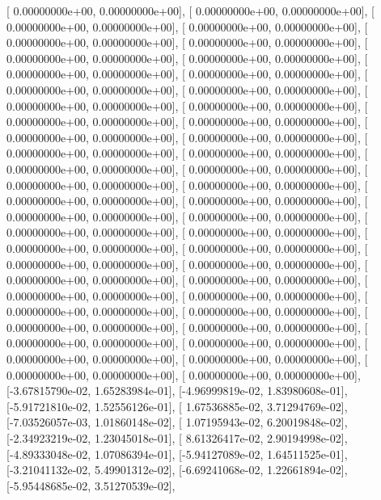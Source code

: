 \documentclass{article}
\begin{document}
       [ 0.00000000e+00,  0.00000000e+00],
       [ 0.00000000e+00,  0.00000000e+00],
       [ 0.00000000e+00,  0.00000000e+00],
       [ 0.00000000e+00,  0.00000000e+00],
       [ 0.00000000e+00,  0.00000000e+00],
       [ 0.00000000e+00,  0.00000000e+00],
       [ 0.00000000e+00,  0.00000000e+00],
       [ 0.00000000e+00,  0.00000000e+00],
       [ 0.00000000e+00,  0.00000000e+00],
       [ 0.00000000e+00,  0.00000000e+00],
       [ 0.00000000e+00,  0.00000000e+00],
       [ 0.00000000e+00,  0.00000000e+00],
       [ 0.00000000e+00,  0.00000000e+00],
       [ 0.00000000e+00,  0.00000000e+00],
       [ 0.00000000e+00,  0.00000000e+00],
       [ 0.00000000e+00,  0.00000000e+00],
       [ 0.00000000e+00,  0.00000000e+00],
       [ 0.00000000e+00,  0.00000000e+00],
       [ 0.00000000e+00,  0.00000000e+00],
       [ 0.00000000e+00,  0.00000000e+00],
       [ 0.00000000e+00,  0.00000000e+00],
       [ 0.00000000e+00,  0.00000000e+00],
       [ 0.00000000e+00,  0.00000000e+00],
       [ 0.00000000e+00,  0.00000000e+00],
       [ 0.00000000e+00,  0.00000000e+00],
       [ 0.00000000e+00,  0.00000000e+00],
       [ 0.00000000e+00,  0.00000000e+00],
       [ 0.00000000e+00,  0.00000000e+00],
       [ 0.00000000e+00,  0.00000000e+00],
       [ 0.00000000e+00,  0.00000000e+00],
       [ 0.00000000e+00,  0.00000000e+00],
       [ 0.00000000e+00,  0.00000000e+00],
       [ 0.00000000e+00,  0.00000000e+00],
       [ 0.00000000e+00,  0.00000000e+00],
       [ 0.00000000e+00,  0.00000000e+00],
       [ 0.00000000e+00,  0.00000000e+00],
       [ 0.00000000e+00,  0.00000000e+00],
       [ 0.00000000e+00,  0.00000000e+00],
       [ 0.00000000e+00,  0.00000000e+00],
       [ 0.00000000e+00,  0.00000000e+00],
       [ 0.00000000e+00,  0.00000000e+00],
       [ 0.00000000e+00,  0.00000000e+00],
       [ 0.00000000e+00,  0.00000000e+00],
       [ 0.00000000e+00,  0.00000000e+00],
       [ 0.00000000e+00,  0.00000000e+00],
       [ 0.00000000e+00,  0.00000000e+00],
       [ 0.00000000e+00,  0.00000000e+00],
       [ 0.00000000e+00,  0.00000000e+00],
       [-3.67815790e-02,  1.65283984e-01],
       [-4.96999819e-02,  1.83980608e-01],
       [-5.91721810e-02,  1.52556126e-01],
       [ 1.67536885e-02,  3.71294769e-02],
       [-7.03526057e-03,  1.01860148e-02],
       [ 1.07195943e-02,  6.20019848e-02],
       [-2.34923219e-02,  1.23045018e-01],
       [ 8.61326417e-02,  2.90194998e-02],
       [-4.89333048e-02,  1.07086394e-01],
       [-5.94127089e-02,  1.64511525e-01],
       [-3.21041132e-02,  5.49901312e-02],
       [-6.69241068e-02,  1.22661894e-02],
       [-5.95448685e-02,  3.51270539e-02],
\end{document}
